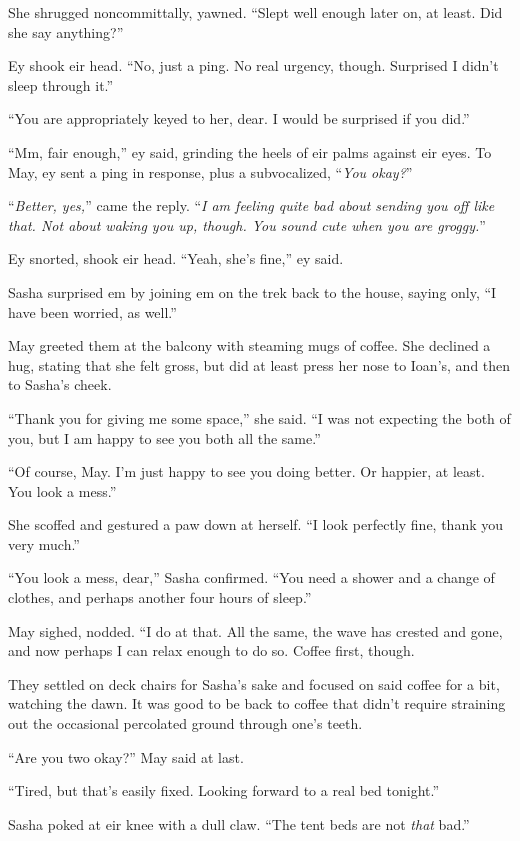 She shrugged noncommittally, yawned. ``Slept well enough later on, at least. Did she say anything?''

Ey shook eir head. ``No, just a ping. No real urgency, though. Surprised I didn't sleep through it.''

``You are appropriately keyed to her, dear. I would be surprised if you did.''

``Mm, fair enough,'' ey said, grinding the heels of eir palms against eir eyes. To May, ey sent a ping in response, plus a subvocalized, ``\emph{You okay?}''

``\emph{Better, yes,}'' came the reply. ``\emph{I am feeling quite bad about sending you off like that. Not about waking you up, though. You sound cute when you are groggy.}''

Ey snorted, shook eir head. ``Yeah, she's fine,'' ey said.

Sasha surprised em by joining em on the trek back to the house, saying only, ``I have been worried, as well.''

May greeted them at the balcony with steaming mugs of coffee. She declined a hug, stating that she felt gross, but did at least press her nose to Ioan's, and then to Sasha's cheek.

``Thank you for giving me some space,'' she said. ``I was not expecting the both of you, but I am happy to see you both all the same.''

``Of course, May. I'm just happy to see you doing better. Or happier, at least. You look a mess.''

She scoffed and gestured a paw down at herself. ``I look perfectly fine, thank you very much.''

``You look a mess, dear,'' Sasha confirmed. ``You need a shower and a change of clothes, and perhaps another four hours of sleep.''

May sighed, nodded. ``I do at that. All the same, the wave has crested and gone, and now perhaps I can relax enough to do so. Coffee first, though.

They settled on deck chairs for Sasha's sake and focused on said coffee for a bit, watching the dawn. It was good to be back to coffee that didn't require straining out the occasional percolated ground through one's teeth.

``Are you two okay?'' May said at last.

``Tired, but that's easily fixed. Looking forward to a real bed tonight.''

Sasha poked at eir knee with a dull claw. ``The tent beds are not \emph{that} bad.''

